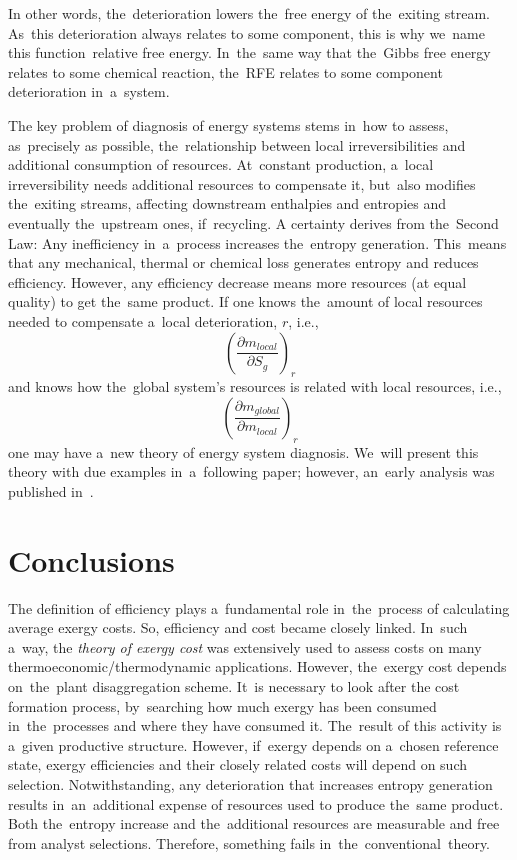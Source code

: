 \documentclass[energies,article,accept,moreauthors,pdftex]{Definitions/mdpi}
\begin{document}
In other words, the~deterioration lowers the~free energy of the~exiting stream. As~this deterioration always relates to some component, this is why we~name this function~relative free energy. In~the~same way that the~Gibbs free energy relates to some chemical reaction, the~RFE relates to some component deterioration in~a~system.

The key problem of diagnosis of energy systems stems in~how to assess, as~precisely as possible, the~relationship between local irreversibilities and additional consumption of resources. At~constant production, a~local irreversibility needs additional resources to compensate it, but~also modifies the~exiting streams, affecting downstream enthalpies and entropies and eventually the~upstream ones, if~recycling.
A certainty derives from the~Second Law: Any inefficiency in~a~process increases the~entropy generation. This~means that any mechanical, thermal or chemical loss generates entropy and reduces efficiency. However, any efficiency decrease means more resources (at equal quality) to get the~same product.
If one knows the~amount of local resources needed to compensate a~local deterioration, $r$, i.e.,
\[
\left(\frac{\partial m_{local}}{\partial S_g}\right)_r
\]
and knows how the~global system's resources is related with local resources, i.e.,
\[
\left(\frac{\partial m_{global}}{\partial m_{local}}\right)_r
\]
one may have a~new theory of energy system diagnosis. We~will present this theory with due examples in~a~following paper; however, an~early analysis was published in~\cite{Royo1997}.

\section{Conclusions}
The definition of efficiency plays a~fundamental role in~the~process of calculating average exergy costs. So, efficiency and cost became closely linked. In~such a~way, the \emph{theory of exergy cost} \cite{Valero1986a,Lozano1993} was extensively used to assess costs on many thermoeconomic/thermodynamic applications. However, the~exergy cost depends on~the~plant disaggregation scheme. It~is necessary to look after the cost formation process, by~searching how much exergy has been consumed in~the~processes and where they have consumed it. The~result of this activity is a~given productive structure. However, if~exergy depends on a~chosen reference state, exergy efficiencies and their closely related costs will depend on such selection. Notwithstanding, any deterioration that increases entropy generation results in~an~additional expense of resources used to produce the~same product. Both the~entropy increase and the~additional resources are measurable and free from analyst selections. Therefore, something fails in~the~conventional~theory.
\end{document}
